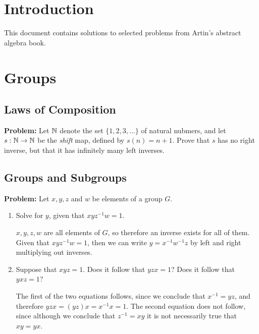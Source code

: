 \documentclass[10pt]{article}
\newenvironment{problem}{\textbf{Problem:}}{}
\begin{document}
\section*{Introduction}
This document contains solutions to selected problems from Artin's abstract 
algebra book. 

\section{Groups}

\subsection{Laws of Composition}
\begin{problem}
	Let \( \mathbb N \) denote the set \( \{ 1, 2, 3, \dots\}  \) of natural nubmers, 
	and let \( s: \mathbb N \to \mathbb N \) be the \textit{shift} map, defined by \( s(n) = n +1 \). 
	Prove that \( s \) has no right inverse, but that it has 
	infinitely many left inverses. 
\end{problem}

\subsection{Groups and Subgroups}
\begin{problem}
	Let \( x, y, z \) and \( w \) be elements of a group \( G \). 
	\begin{enumerate}[label=\alph*)]
		\item Solve for \( y \), given that \( xyz^{-1}w = 1 \).
			
			\begin{solution}
				\( x, y, z, w \) are all elements of \( G \), so therefore an inverse 
				exists for all of them. Given that \( xyz^{-1} w = 1 \), then we can
				write \( y = x^{-1} w^{-1}z \) by left and right 
				multiplying out inverses.
			\end{solution}
		\item Suppose that \( xyz = 1 \). Does it follow that 
			\( yzx = 1 \)? Does it follow that \( yxz = 1 \)?

			\begin{solution}
				The first of the two equations follows, since we conclude that 
				\( x^{-1} = yz \), and therefore \( yzx = (yz)x = x^{-1} x = 1 \). 
				The second equation does not follow, since although we
				 conclude that \( z^{-1} = xy \) it is not necessarily 
				 true that \( xy = yx \). 
			\end{solution}
	\end{enumerate}
\end{problem}
\end{document}
